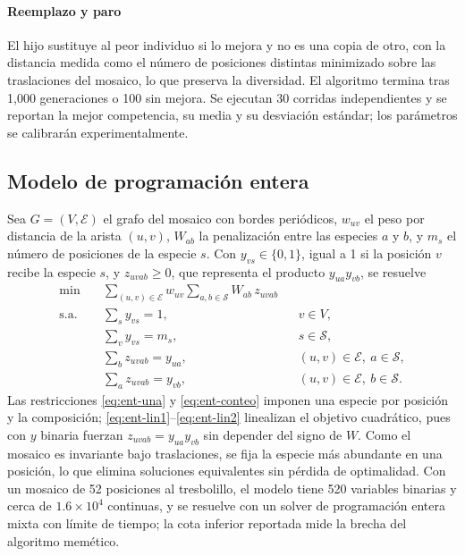 \paragraph{Reemplazo y paro} El hijo sustituye al peor individuo si lo mejora y no es una copia de otro, con la distancia medida como el número de posiciones distintas minimizado sobre las traslaciones del mosaico, lo que preserva la diversidad. El algoritmo termina tras 1{,}000 generaciones o 100 sin mejora. Se ejecutan 30 corridas independientes y se reportan la mejor competencia, su media y su desviación estándar; los parámetros se calibrarán experimentalmente.

\subsection{Modelo de programación entera}
\label{subsec:espacial-entera}

Sea $G=(V,\mathcal{E})$ el grafo del mosaico con bordes periódicos, $w_{uv}$ el peso por distancia de la arista $(u,v)$, $W_{ab}$ la penalización entre las especies $a$ y $b$, y $m_s$ el número de posiciones de la especie $s$. Con $y_{vs}\in\{0,1\}$, igual a 1 si la posición $v$ recibe la especie $s$, y $z_{uvab}\geq0$, que representa el producto $y_{ua}y_{vb}$, se resuelve
\begin{align}
\min\quad & \sum_{(u,v)\in\mathcal{E}}w_{uv}\sum_{a,b\in\mathcal{S}}W_{ab}\,z_{uvab} \label{eq:ent-obj}\\
\text{s.a.}\quad & \textstyle\sum_{s}y_{vs}=1, && v\in V, \label{eq:ent-una}\\
& \textstyle\sum_{v}y_{vs}=m_s, && s\in\mathcal{S}, \label{eq:ent-conteo}\\
& \textstyle\sum_{b}z_{uvab}=y_{ua}, && (u,v)\in\mathcal{E},\ a\in\mathcal{S}, \label{eq:ent-lin1}\\
& \textstyle\sum_{a}z_{uvab}=y_{vb}, && (u,v)\in\mathcal{E},\ b\in\mathcal{S}. \label{eq:ent-lin2}
\end{align}
Las restricciones \eqref{eq:ent-una} y \eqref{eq:ent-conteo} imponen una especie por posición y la composición; \eqref{eq:ent-lin1}--\eqref{eq:ent-lin2} linealizan el objetivo cuadrático, pues con $y$ binaria fuerzan $z_{uvab}=y_{ua}y_{vb}$ sin depender del signo de $W$. Como el mosaico es invariante bajo traslaciones, se fija la especie más abundante en una posición, lo que elimina soluciones equivalentes sin pérdida de optimalidad. Con un mosaico de 52 posiciones al tresbolillo, el modelo tiene 520 variables binarias y cerca de $1.6\times10^4$ continuas, y se resuelve con un solver de programación entera mixta con límite de tiempo; la cota inferior reportada mide la brecha del algoritmo memético.
